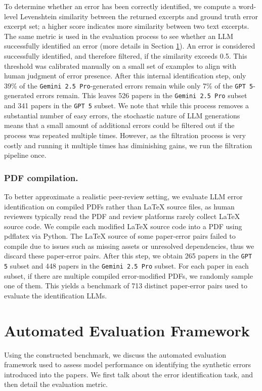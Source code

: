 \documentclass{article}
\newcommand{\gemini}{\texttt{Gemini 2.5 Pro}}
\newcommand{\gpt}{\texttt{GPT 5}}
\begin{document}
To determine whether an error has been correctly identified, we compute a word-level Levenshtein similarity between the returned excerpts and ground truth error excerpt set; a higher score indicates more similarity between two text excerpts. The same metric is used in the evaluation process to see whether an LLM successfully identified an error (more details in Section \ref{section:evaluation}). An error is considered successfully identified, and therefore filtered, if the similarity exceeds 0.5. This threshold was calibrated manually on a small set of examples to align with human judgment of error presence. After this internal identification step, only 39\% of the \gemini{}-generated errors remain while only 7\% of the \gpt{}-generated errors remain. This leaves 526 papers in the \gemini{} subset and 341 papers in the \gpt{} subset. We note that while this process removes a substantial number of easy errors, the stochastic nature of LLM generations means that a small amount of additional errors could be filtered out if the process was repeated multiple times. However, as the filtration process is very costly and running it multiple times has diminishing gains, we run the filtration pipeline once.

\subsubsection{PDF compilation.} To better approximate a realistic peer-review setting, we evaluate LLM error identification on compiled PDFs rather than LaTeX source files, as human reviewers typically read the PDF and review platforms rarely collect LaTeX source code. We compile each modified LaTeX source code into a PDF using pdflatex via Python. The LaTeX source of some paper-error pairs failed to compile due to issues such as missing assets or unresolved dependencies, thus we discard these paper-error pairs. After this step, we obtain 265 papers in the \gpt{} subset and 448 papers in the \gemini{} subset. For each paper in each subset, if there are multiple compiled error-modified PDFs, we randomly sample one of them. This yields a benchmark of 713 distinct paper-error pairs used to evaluate the identification LLMs. 

\section{Automated Evaluation Framework}
\label{section:evaluation}
Using the constructed benchmark, we discuss the automated evaluation framework used to assess model performance on identifying the synthetic errors introduced into the papers. We first talk about the error identification task, and then detail the evaluation metric.
\end{document}
